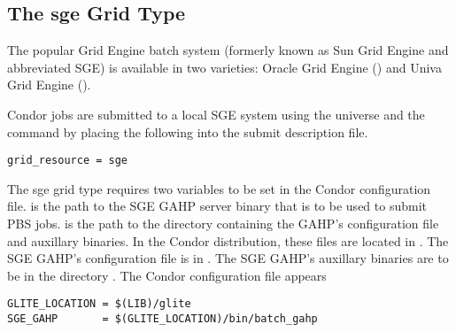 
\subsection{\label{sec:SGE}The sge Grid Type }


The popular Grid Engine batch system (formerly known as Sun Grid Engine and
abbreviated SGE) is available in two varieties:
Oracle Grid Engine
()
and Univa Grid Engine
().

Condor jobs are submitted to a local SGE system
using the  universe and the
 command by placing the following
into the submit description file.
\begin{verbatim}
grid_resource = sge
\end{verbatim}

The sge grid type requires two variables to be set in the Condor
configuration file.
 is the path to the SGE GAHP server binary that is to be
used to submit PBS jobs.
 is the path to the directory containing the GAHP's
configuration file and auxillary binaries.
In the Condor distribution, these files are located in 
.
The SGE GAHP's configuration file is in
.
The SGE GAHP's auxillary binaries
are to be in the directory .
The Condor configuration file appears

\footnotesize
\begin{verbatim}
GLITE_LOCATION = $(LIB)/glite
SGE_GAHP       = $(GLITE_LOCATION)/bin/batch_gahp
\end{verbatim}
\normalsize

